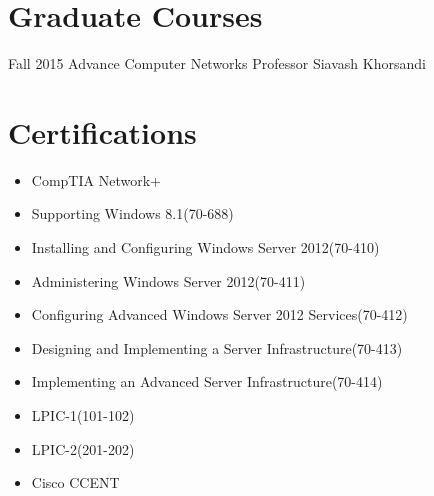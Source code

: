 \documentclass[]{friggeri-cv} %
\begin{document}

\section{Graduate Courses}

\begin{entrylist}

\entry
{Fall 2015}
{Advance Computer Networks}
{Professor Siavash Khorsandi}
{}


\end{entrylist}


\section{Certifications}
\begin{itemize}
	\item CompTIA Network+
	\item Supporting Windows 8.1(70-688)
	\item Installing and Configuring Windows Server 2012(70-410)
	\item Administering Windows Server 2012(70-411)
	\item Configuring Advanced Windows Server 2012 Services(70-412)
	\item Designing and Implementing a Server Infrastructure(70-413)
	\item Implementing an Advanced Server Infrastructure(70-414)
	\item LPIC-1(101-102)
	\item LPIC-2(201-202)
	\item Cisco CCENT
\end{itemize}


\end{document}
